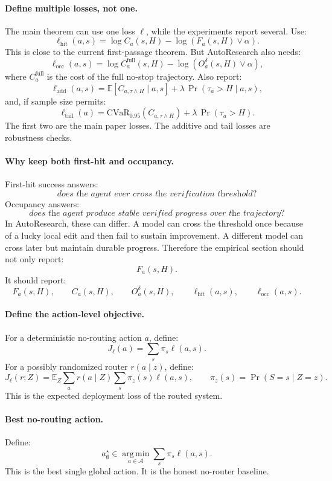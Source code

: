 \documentclass{article}
\providecommand{\argmin}{\operatorname*{arg\,min}}
\begin{document}
\paragraph{Define multiple losses, not one.}
The main theorem can use one loss \(\ell\), while the experiments report several.
Use:
\[
    \ell_{\mathrm{hit}}(a,s)
    =
    \log C_a(s,H)-\log(F_a(s,H)\vee \alpha).
\]
This is close to the current first-passage theorem.
But AutoResearch also needs:
\[
    \ell_{\mathrm{occ}}(a,s)
    =
    \log C_a^{\mathrm{full}}(s,H)-\log(O_a^\delta(s,H)\vee \alpha),
\]
where \(C_a^{\mathrm{full}}\) is the cost of the full no-stop trajectory.
Also report:
\[
    \ell_{\mathrm{add}}(a,s)
    =
    \mathbb E[C_{a,\tau\wedge H}\mid a,s]
    +
    \lambda\,\Pr(\tau_a>H\mid a,s),
\]
and, if sample size permits:
\[
    \ell_{\mathrm{tail}}(a)
    =
    \mathrm{CVaR}_{0.95}(C_{a,\tau\wedge H})
    +
    \lambda\,\Pr(\tau_a>H).
\]
The first two are the main paper losses.
The additive and tail losses are robustness checks.

\paragraph{Why keep both first-hit and occupancy.}
First-hit success answers:
\[
    \textit{does the agent ever cross the verification threshold?}
\]
Occupancy answers:
\[
    \textit{does the agent produce stable verified progress over the trajectory?}
\]
In AutoResearch, these can differ.
A model can cross the threshold once because of a lucky local edit and then fail to sustain
improvement.
A different model can cross later but maintain durable progress.
Therefore the empirical section should not only report:
\[
    F_a(s,H).
\]
It should report:
\[
    F_a(s,H),
    \qquad
    C_a(s,H),
    \qquad
    O_a^\delta(s,H),
    \qquad
    \ell_{\mathrm{hit}}(a,s),
    \qquad
    \ell_{\mathrm{occ}}(a,s).
\]

\paragraph{Define the action-level objective.}
For a deterministic no-routing action \(a\), define:
\[
    J_\ell(a)
    =
    \sum_s \pi_s \ell(a,s).
\]
For a possibly randomized router \(r(a\mid z)\), define:
\[
    J_\ell(r;Z)
    =
    \mathbb E_Z
    \sum_a r(a\mid Z)
    \sum_s \pi_z(s)\ell(a,s),
    \qquad
    \pi_z(s)=\Pr(S=s\mid Z=z).
\]
This is the expected deployment loss of the routed system.

\paragraph{Best no-routing action.}
Define:
\[
    a^\star_{\emptyset}
    \in
    \argmin_{a\in\mathcal A}
    \sum_s \pi_s\ell(a,s).
\]
This is the best single global action.
It is the honest no-router baseline.
\end{document}
